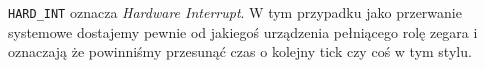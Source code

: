 \texttt{HARD\_INT} oznacza \textit{Hardware Interrupt}. W tym przypadku jako przerwanie systemowe dostajemy pewnie od jakiegoś urządzenia pełniącego rolę zegara i oznaczają że powinniśmy przesunąć czas o kolejny tick czy coś w tym stylu.